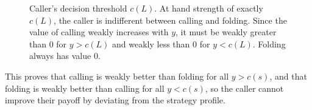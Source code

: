\documentclass[../../main/main.tex]{subfiles}
\begin{document}
\begin{customproof}
\begin{enumerate}
\begin{figure}[h]
                \caption{Caller's decision threshold $c(L)$. At hand strength of exactly $c(L)$, the caller is indifferent between calling and folding. Since the value of calling weakly increases with $y$, it must be weakly greater than 0 for $y > c(L)$ and weakly less than 0 for $y < c(L)$. Folding always has value 0.}
                \label{fig:caller_threshold}
            \end{figure}

            This proves that calling is weakly better than folding for all $y > c(s)$, and that folding is weakly better than calling for all $y < c(s)$, so the caller cannot improve their payoff by deviating from the strategy profile.  


\end{enumerate}
\end{customproof}
\end{document}
